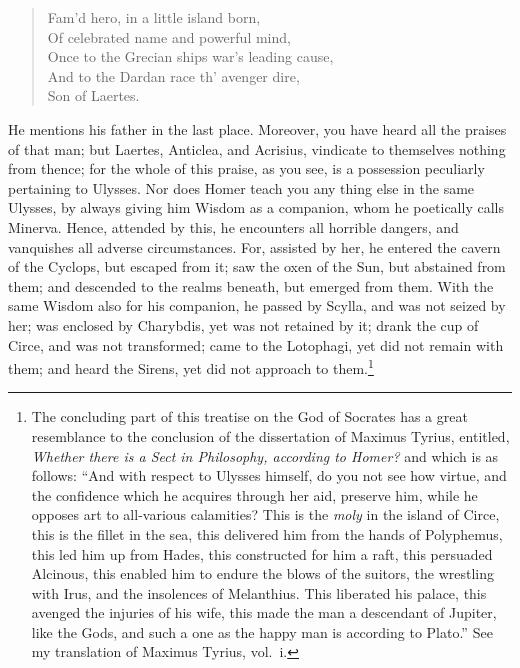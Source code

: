 \documentclass[twoside]{article}
\begin{document}
\begin{verse}
Fam'd hero, in a little island born,\\
Of celebrated name and powerful mind,\\
Once to the Grecian ships war's leading cause,\\
And to the Dardan race th' avenger dire,\\
Son of Laertes.
\end{verse}

\noindent He mentions his father in the last place. Moreover, you have heard
all the praises of that man; but Laertes, Anticlea, and Acrisius, vindicate
to themselves nothing from thence; for the whole of this praise, as you see, is
a possession peculiarly pertaining to Ulysses. Nor does Homer teach you any
thing else in the same Ulysses, by always giving him Wisdom as a companion,
whom he poetically calls Minerva. Hence, attended by this, he encounters all
horrible dangers, and vanquishes all adverse circumstances. For, assisted by
her, he entered the cavern of the Cyclops, but escaped from it; saw the oxen of
the Sun, but abstained from them; and descended to the realms beneath, but
emerged from them. With the same Wisdom also for his companion, he passed by
Scylla, and was not seized by her; was enclosed by Charybdis, yet was not
retained by it; drank the cup of Circe, and was not transformed; came to the
Lotophagi, yet did not remain with them; and heard the Sirens, yet did not
approach to them.\footnote{The concluding part of this treatise on the God of
Socrates has a great resemblance to the conclusion of the dissertation of
Maximus Tyrius, entitled, \textit{Whether there is a Sect in Philosophy,
according to Homer?} and which is as follows: ``And with respect to Ulysses
himself, do you not see how virtue, and the confidence which he acquires
through her aid, preserve him, while he opposes art to all-various calamities?
This is the \textit{moly} in the island of Circe, this is the fillet in the
sea, this delivered him from the hands of Polyphemus, this led him up from
Hades, this constructed for him a raft, this persuaded Alcinous, this enabled
him to endure the blows of the suitors, the wrestling with Irus, and the
insolences of Melanthius. This liberated his palace, this avenged the injuries
of his wife, this made the man a descendant of Jupiter, like the Gods, and such
a one as the happy man is according to Plato.'' See my translation of Maximus
Tyrius, vol.~i.}
\end{document}
